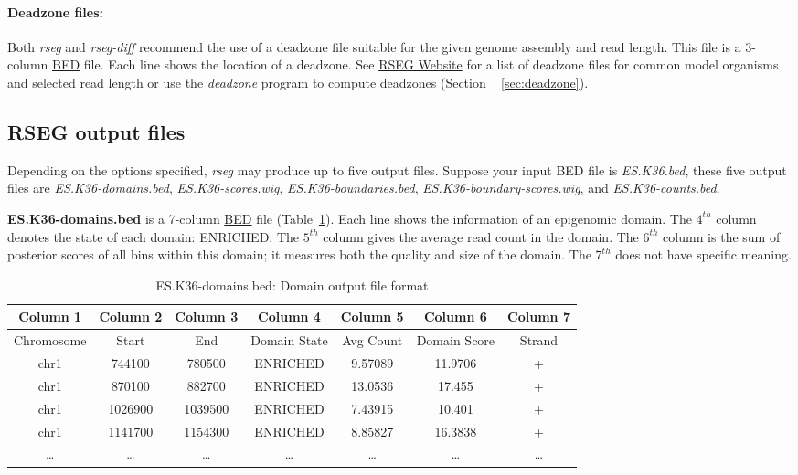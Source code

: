 \documentclass[11pt]{report}
\begin{document}
\paragraph{Deadzone files:} Both \textit{rseg} and \textit{rseg-diff}
recommend the use of a deadzone file suitable for the given genome
assembly and read length. This file is a 3-column
\href{http://genome.ucsc.edu/FAQ/FAQformat.html#format1}{BED}
file. Each line shows the location of a deadzone. See
\href{http://smithlab.cmb.usc.edu/histone/software}{RSEG Website} for
a list of deadzone files for common model organisms and selected read
length or use the \textit{deadzone} program to compute deadzones
(Section ~ \ref{sec:deadzone}).
 
\subsection{RSEG output files}
\label{sec:rseg-output}

Depending on the options specified, \textit{rseg} may produce up to five output
files. Suppose your input BED file is \textit{ES.K36.bed}, these five output
files are \textit{ES.K36-domains.bed}, \textit{ES.K36-scores.wig},
\textit{ES.K36-boundaries.bed}, \textit{ES.K36-boundary-scores.wig},
and \textit{ES.K36-counts.bed}.

\textbf{ES.K36-domains.bed} is a 7-column
\href{http://genome.ucsc.edu/FAQ/FAQformat.html#format1}{BED} file
(Table~\ref{tab:format-domain}). Each line shows the information of an
epigenomic domain. The $4^{th}$ column denotes the state of each
domain: ENRICHED.  The $5^{th}$ column gives the average read count in
the domain. The $6^{th}$ column is the sum of posterior scores of all
bins within this domain; it measures both the quality and size of the
domain. The $7^{th}$ does not have specific meaning.

\begin{table}[th]
  \centering
  \begin{tabular}{c c c c c c c}
Column 1 & Column 2 & Column 3 &  Column 4 & Column 5 &  Column 6  &
Column 7 \\
\hline
Chromosome  & Start & End & Domain State &  Avg Count & Domain Score &  Strand \\
\hline
chr1 &   744100  &780500  &ENRICHED        &9.57089 &11.9706 &+ \\
chr1 &   870100  &882700  &ENRICHED        &13.0536 &17.455  &+ \\
chr1 &   1026900 &1039500 &ENRICHED        &7.43915 &10.401  &+ \\
chr1 &   1141700 &1154300 &ENRICHED        &8.85827 &16.3838 &+ \\
\ldots & \ldots &\ldots &\ldots &\ldots &\ldots & \ldots\\ 
\hline
  \end{tabular}
  \caption{ES.K36-domains.bed: Domain output file format}
  \label{tab:format-domain}
\end{table}
\end{document}
